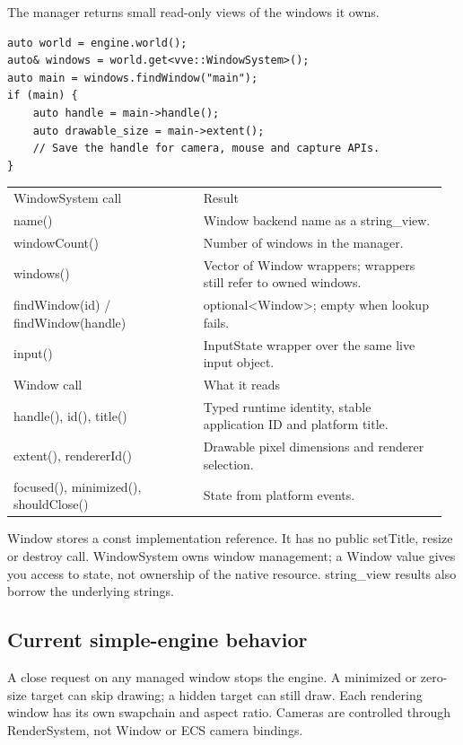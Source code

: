 \documentclass[11pt,a4paper]{article}
\begin{document}
\label{core-12}
The manager returns small read-only views of the windows it owns.

\begin{lstlisting}[language={}]
auto world = engine.world();
auto& windows = world.get<vve::WindowSystem>();
auto main = windows.findWindow("main");
if (main) {
    auto handle = main->handle();
    auto drawable_size = main->extent();
    // Save the handle for camera, mouse and capture APIs.
}
\end{lstlisting}

{\small
\begin{longtable}{@{}p{0.42\linewidth}p{0.54\linewidth}@{}}
WindowSystem call & Result \\
name() & Window backend name as a string\_view. \\
windowCount() & Number of windows in the manager. \\
windows() & Vector of Window wrappers; wrappers still refer to owned windows. \\
findWindow(id) / findWindow(handle) & optional<Window>; empty when lookup fails. \\
input() & InputState wrapper over the same live input object. \\
Window call & What it reads \\
handle(), id(), title() & Typed runtime identity, stable application ID and platform title. \\
extent(), rendererId() & Drawable pixel dimensions and renderer selection. \\
focused(), minimized(), shouldClose() & State from platform events. \\
\end{longtable}
}

Window stores a const implementation reference. It has no public setTitle, resize or destroy call. WindowSystem owns window management; a Window value gives you access to state, not ownership of the native resource. string\_view results also borrow the underlying strings.

\subsection*{Current simple-engine behavior}
A close request on any managed window stops the engine. A minimized or zero-size target can skip drawing; a hidden target can still draw. Each rendering window has its own swapchain and aspect ratio. Cameras are controlled through RenderSystem, not Window or ECS camera bindings.
\end{document}
